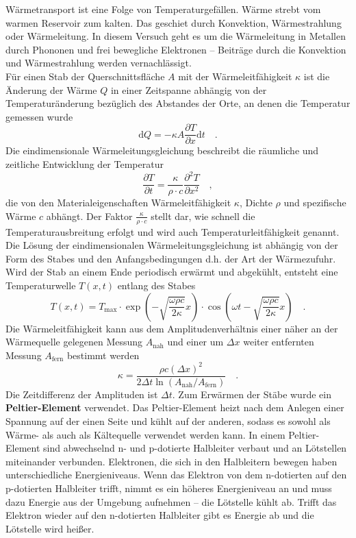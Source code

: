 Wärmetransport ist eine Folge von Temperaturgefällen. Wärme strebt vom warmen Reservoir zum kalten. Das geschiet durch Konvektion, Wärmestrahlung oder Wärmeleitung. In diesem Versuch geht es um die Wärmeleitung in Metallen durch Phononen und frei bewegliche Elektronen -- Beiträge durch die Konvektion und Wärmestrahlung werden vernachlässigt. \\
Für einen Stab der Querschnittsfläche $A$ mit der Wärmeleitfähigkeit $\kappa$ ist die Änderung der Wärme $Q$ in einer Zeitspanne abhängig von der Temperaturänderung bezüglich des Abstandes der Orte, an denen die Temperatur gemessen wurde
\begin{equation}\label{Warmestrom}
\text{d}Q = - \kappa A \frac{\partial T}{\partial x} \text{d}t \quad .
\end{equation}
Die eindimensionale Wärmeleitungsgleichung beschreibt die räumliche und zeitliche Entwicklung der Temperatur
\begin{equation}
\frac{\partial T}{\partial t} = \frac{\kappa}{\rho \cdot c} \frac{\partial ^2 T}{\partial x^2} \quad,
\end{equation}
die von den Materialeigenschaften Wärmeleitfähigkeit $\kappa$, Dichte $\rho$ und spezifische Wärme $c$ abhängt.  Der Faktor $\frac{\kappa}{\rho \cdot c}$ stellt dar, wie schnell die Temperaturausbreitung erfolgt und wird auch Temperaturleitfähigkeit genannt. \\
Die Lösung der eindimensionalen Wärmeleitungsgleichung ist abhängig von der Form des Stabes und den Anfangsbedingungen d.h. der Art der Wärmezufuhr. Wird der Stab an einem Ende periodisch erwärmt und abgekühlt, entsteht eine Temperaturwelle $T(x,t)$ entlang des Stabes 
\begin{equation}
T(x,t) = T_\text{max} \cdot \exp\left( - \sqrt{\frac{\omega \rho c}{2 \kappa}}x\right) \cdot \cos \left(\omega t - \sqrt{\frac{\omega \rho c}{2 \kappa}}x\right) \quad.
\end{equation}
Die Wärmeleitfähigkeit kann aus dem Amplitudenverhältnis einer näher an der Wärmequelle gelegenen Messung $A_\text{nah}$ und einer um $\Delta x$ weiter entfernten Messung $A_\text{fern}$ bestimmt werden
\begin{equation}\label{Warmekappazitat}
\kappa = \frac{\rho  c (\Delta x )^2}{2  \Delta t \ln \left(A_\text{nah} / A_\text{fern}\right)} \quad.
\end{equation}
Die Zeitdifferenz der Amplituden ist $\Delta t$. \newpage
Zum Erwärmen der Stäbe wurde ein \textbf{Peltier-Element} verwendet. Das Peltier-Element heizt nach dem Anlegen einer Spannung auf der einen Seite und kühlt auf der anderen, sodass es sowohl als Wärme- als auch als Kältequelle verwendet werden kann. In einem Peltier-Element sind abwechselnd n- und p-dotierte Halbleiter verbaut und an Lötstellen miteinander verbunden. Elektronen, die sich in den Halbleitern bewegen haben unterschiedliche Energieniveaus. Wenn das Elektron von dem n-dotierten auf den p-dotierten Halbleiter trifft, nimmt es ein höheres Energieniveau an und muss dazu Energie aus der Umgebung aufnehmen -- die Lötstelle kühlt ab. Trifft  das Elektron wieder auf den n-dotierten Halbleiter gibt es Energie ab und die Lötstelle wird heißer.


